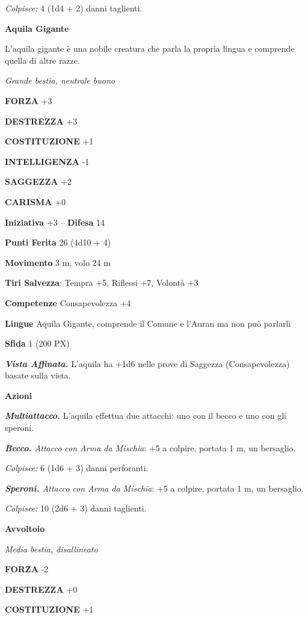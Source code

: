 \begin{multicols}{2}
	\textit{Colpisce:} 4 (1d4 + 2) danni taglienti.

	\medskip\textbf{Aquila Gigante}

	L'aquila gigante è una nobile creatura che parla la propria lingua e comprende quella di altre razze.

	\textit{Grande bestia, neutrale buono}

	\textbf{FORZA} +3

	\textbf{DESTREZZA} +3

	\textbf{COSTITUZIONE} +1

	\textbf{INTELLIGENZA} -1

	\textbf{SAGGEZZA} +2

	\textbf{CARISMA} +0

	\textbf{Iniziativa} +3 -- \textbf{Difesa} 14

	\textbf{Punti Ferita} 26 (4d10 + 4)

	\textbf{Movimento} 3 m, volo 24 m

	\textbf{Tiri Salvezza}: Tempra +5, Riflessi +7, Volontà +3

	\textbf{Competenze} Consapevolezza +4

	\textbf{Lingue} Aquila Gigante, comprende il Comune e l'Auran ma non può parlarli

	\textbf{Sfida} 1 (200 PX)

	\textit{\textbf{Vista Affinata.}} L'aquila ha +1d6 nelle prove di Saggezza (Consapevolezza) basate sulla vista.

	\textbf{Azioni}

	\textit{\textbf{Multiattacco.}} L'aquila effettua due attacchi: uno con il becco e uno con gli speroni.

	\textit{\textbf{Becco.} Attacco con Arma da Mischia}: +5 a colpire, portata 1 m, un bersaglio.

	\textit{Colpisce:} 6 (1d6 + 3) danni perforanti.

	\textit{\textbf{Speroni.} Attacco con Arma da Mischia}: +5 a colpire, portata 1 m, un bersaglio.

	\textit{Colpisce:} 10 (2d6 + 3) danni taglienti.

	\medskip\textbf{Avvoltoio}

	\textit{Media bestia, disallineato}

	\textbf{FORZA} -2

	\textbf{DESTREZZA} +0

	\textbf{COSTITUZIONE} +1


\end{multicols}

